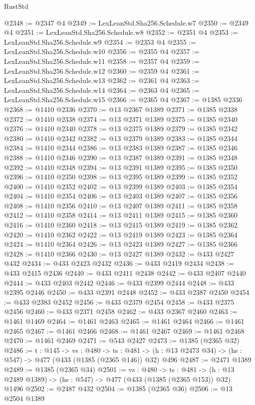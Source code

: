 \begin{lexlean}{RustStd}
\begin{coremodule}
@2348 := @2347 @4
@2349 := LexLeanStd.Sha256.Schedule.w7
@2350 := @2349 @4
@2351 := LexLeanStd.Sha256.Schedule.w8
@2352 := @2351 @4
@2353 := LexLeanStd.Sha256.Schedule.w9
@2354 := @2353 @4
@2355 := LexLeanStd.Sha256.Schedule.w10
@2356 := @2355 @4
@2357 := LexLeanStd.Sha256.Schedule.w11
@2358 := @2357 @4
@2359 := LexLeanStd.Sha256.Schedule.w12
@2360 := @2359 @4
@2361 := LexLeanStd.Sha256.Schedule.w13
@2362 := @2361 @4
@2363 := LexLeanStd.Sha256.Schedule.w14
@2364 := @2363 @4
@2365 := LexLeanStd.Sha256.Schedule.w15
@2366 := @2365 @4
@2367 := @1385 @2336
@2368 := @1410 @2336
@2370 := @13 @2367 @1389
@2371 := @1385 @2338
@2372 := @1410 @2338
@2374 := @13 @2371 @1389
@2375 := @1385 @2340
@2376 := @1410 @2340
@2378 := @13 @2375 @1389
@2379 := @1385 @2342
@2380 := @1410 @2342
@2382 := @13 @2379 @1389
@2383 := @1385 @2344
@2384 := @1410 @2344
@2386 := @13 @2383 @1389
@2387 := @1385 @2346
@2388 := @1410 @2346
@2390 := @13 @2387 @1389
@2391 := @1385 @2348
@2392 := @1410 @2348
@2394 := @13 @2391 @1389
@2395 := @1385 @2350
@2396 := @1410 @2350
@2398 := @13 @2395 @1389
@2399 := @1385 @2352
@2400 := @1410 @2352
@2402 := @13 @2399 @1389
@2403 := @1385 @2354
@2404 := @1410 @2354
@2406 := @13 @2403 @1389
@2407 := @1385 @2356
@2408 := @1410 @2356
@2410 := @13 @2407 @1389
@2411 := @1385 @2358
@2412 := @1410 @2358
@2414 := @13 @2411 @1389
@2415 := @1385 @2360
@2416 := @1410 @2360
@2418 := @13 @2415 @1389
@2419 := @1385 @2362
@2420 := @1410 @2362
@2422 := @13 @2419 @1389
@2423 := @1385 @2364
@2424 := @1410 @2364
@2426 := @13 @2423 @1389
@2427 := @1385 @2366
@2428 := @1410 @2366
@2430 := @13 @2427 @1389
@2432 := @433 @2427 @432
@2434 := @433 @2423 @2432
@2436 := @433 @2419 @2434
@2438 := @433 @2415 @2436
@2440 := @433 @2411 @2438
@2442 := @433 @2407 @2440
@2444 := @433 @2403 @2442
@2446 := @433 @2399 @2444
@2448 := @433 @2395 @2446
@2450 := @433 @2391 @2448
@2452 := @433 @2387 @2450
@2454 := @433 @2383 @2452
@2456 := @433 @2379 @2454
@2458 := @433 @2375 @2456
@2460 := @433 @2371 @2458
@2462 := @433 @2367 @2460
@2463 := @1461 @1469
@2464 := @1461 @2463
@2465 := @1461 @2464
@2466 := @1461 @2465
@2467 := @1461 @2466
@2468 := @1461 @2467
@2469 := @1461 @2468
@2470 := @1461 @2469
@2471 := @543 @2427
@2473 := @1385 (@2365 @32)
@2486 := {t : @145} ->
  {vs : @480} ->
  {ts : @481} -> (h : @13 @2473 @34) -> (hs : @547) -> @477 (@433 (@1385 (@2365 @146)) @32) @496
@2487 := @2471 @1389
@2489 := @1385 (@2365 @34)
@2501 := {vs : @480} ->
  {ts : @481} -> (h : @13 @2489 @1389) -> (hs : @547) -> @477 (@433 (@1385 (@2365 @153)) @32) @1496
@2502 := @2487 @432
@2504 := @1385 (@2365 @36)
@2506 := @13 @2504 @1389

\end{coremodule}
\end{lexlean}
